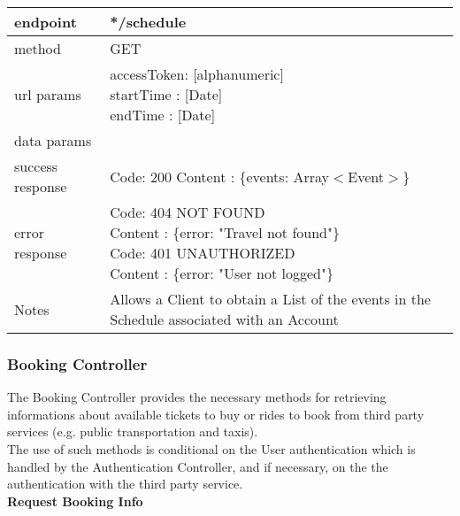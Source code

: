 \begin{tabularx}{\linewidth}{| l | l |}
	\hline
	endpoint & */schedule \\
	\hline
	method & GET \\
	\hline
	url params & 
	\parbox{0.7\textwidth}{
		\bigskip
		accessToken: [alphanumeric] \\
		startTime : [Date] \\
		endTime : [Date]
		\bigskip
	} \\
	\hline
	data params & \\
	\hline
	success response &
	\parbox{0.7\textwidth}{
		\bigskip
		Code: 200\\
		Content : \{events: Array$<$Event$>$\}
		\bigskip
	} \\
	\hline
	error response &
	\parbox{0.7\textwidth}{
		\bigskip
		Code: 404 NOT FOUND \\
		Content : \{error: "Travel not found"\}\\
		Code: 401 UNAUTHORIZED \\
		Content : \{error: "User not logged"\}
		\bigskip
	} \\
	\hline
	Notes & 
	\parbox{0.7\textwidth}{
		\bigskip
		Allows a Client to obtain a List of the events in the Schedule associated with an Account
		\bigskip
	} \\
	\hline
\end{tabularx}

\subsubsection*{Booking Controller}

The Booking Controller provides the necessary methods for retrieving informations about available tickets to buy or rides to book from third party services (e.g. public transportation and taxis).\\ 
The use of such methods is conditional on the User authentication which is handled by the Authentication Controller, and if necessary, on the the authentication with the third party service.\\

\textbf{Request Booking Info}

